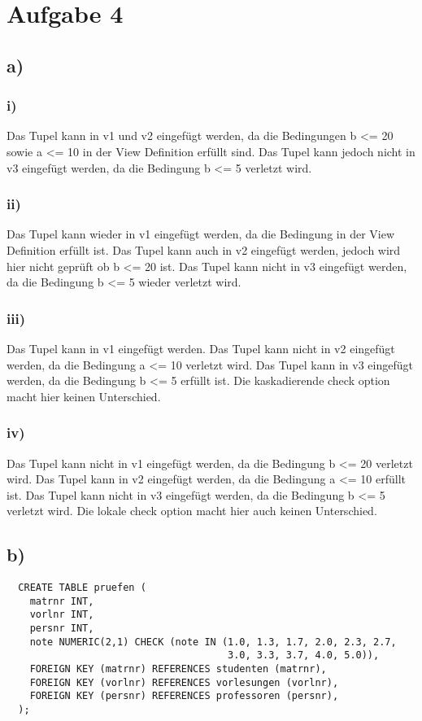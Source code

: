 \pagebreak
\section*{Aufgabe 4}
\subsection*{a)}
\subsubsection*{i)}
Das Tupel kann in v1 und v2 eingefügt werden, da die Bedingungen b <= 20 sowie a <= 10 in der View Definition erfüllt sind. Das Tupel kann jedoch nicht in v3 eingefügt werden, da die Bedingung b <= 5 verletzt wird.
\subsubsection*{ii)}
Das Tupel kann wieder in v1 eingefügt werden, da die Bedingung in der View Definition erfüllt ist. Das Tupel kann auch in v2 eingefügt werden, jedoch wird hier nicht geprüft ob b <= 20 ist. Das Tupel kann nicht in v3 eingefügt werden, da die Bedingung b <= 5 wieder verletzt wird.
\subsubsection*{iii)}
Das Tupel kann in v1 eingefügt werden. Das Tupel kann nicht in v2 eingefügt werden, da die Bedingung a <= 10 verletzt wird. Das Tupel kann in v3 eingefügt werden, da die Bedingung b <= 5 erfüllt ist. Die kaskadierende check option macht hier keinen Unterschied.
\subsubsection*{iv)}
Das Tupel kann nicht in v1 eingefügt werden, da die Bedingung b <= 20 verletzt wird. Das Tupel kann in v2 eingefügt werden, da die Bedingung a <= 10 erfüllt ist. Das Tupel kann nicht in v3 eingefügt werden, da die Bedingung b <= 5 verletzt wird. Die lokale check option macht hier auch keinen Unterschied.
\subsection*{b)}
\begin{verbatim}
  CREATE TABLE pruefen (
    matrnr INT,
    vorlnr INT,
    persnr INT,
    note NUMERIC(2,1) CHECK (note IN (1.0, 1.3, 1.7, 2.0, 2.3, 2.7,
                                      3.0, 3.3, 3.7, 4.0, 5.0)),
    FOREIGN KEY (matrnr) REFERENCES studenten (matrnr),
    FOREIGN KEY (vorlnr) REFERENCES vorlesungen (vorlnr),
    FOREIGN KEY (persnr) REFERENCES professoren (persnr),
  );
\end{verbatim}
